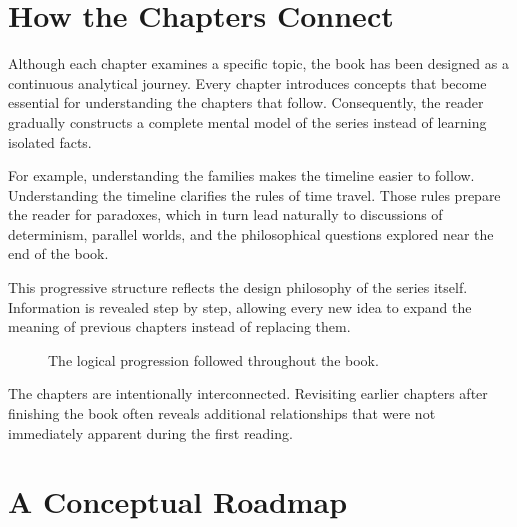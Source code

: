 \documentclass[12pt,oneside,openany]{book}
\begin{document}
\section{How the Chapters Connect}

Although each chapter examines a specific topic, the book has been designed as
a continuous analytical journey. Every chapter introduces concepts that become
essential for understanding the chapters that follow. Consequently, the reader
gradually constructs a complete mental model of the series instead of learning
isolated facts.

For example, understanding the families makes the timeline easier to follow.
Understanding the timeline clarifies the rules of time travel. Those rules
prepare the reader for paradoxes, which in turn lead naturally to discussions
of determinism, parallel worlds, and the philosophical questions explored near
the end of the book.

This progressive structure reflects the design philosophy of the series
itself. Information is revealed step by step, allowing every new idea to
expand the meaning of previous chapters instead of replacing them.

\begin{figure}[H]
\centering
{}
\caption{The logical progression followed throughout the book.}
\end{figure}

\begin{tcolorbox}[colback=yellow!8,colframe=orange!70!black,title=Reader's Note]
The chapters are intentionally interconnected. Revisiting earlier chapters
after finishing the book often reveals additional relationships that were not
immediately apparent during the first reading.
\end{tcolorbox}
\section{A Conceptual Roadmap}
\end{document}
